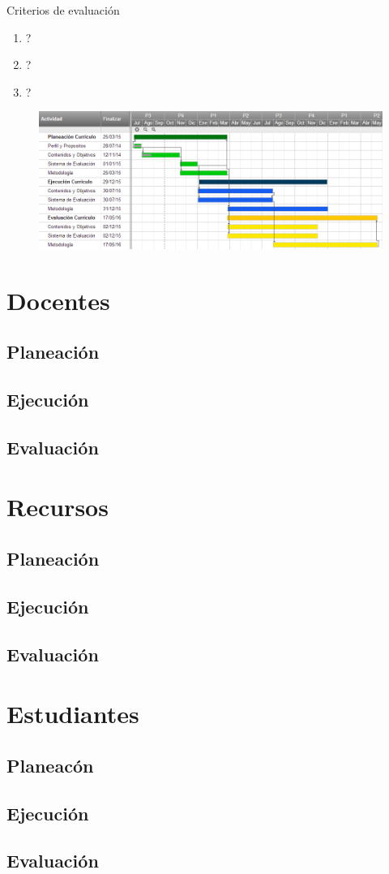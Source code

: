 \documentclass{beamer}
\begin{document}
\begin{frame}
\begin{block}{Criterios de evaluaci\'on}
\begin{enumerate}
\item ?
\item ?
\item ?
\end{enumerate}
\end{block}
\end{frame}
\begin{frame}
\begin{center}

\begin{figure}
\includegraphics[scale=0.4]{gannt.png}
\end{figure}
\end{center}
\end{frame}
\section{Docentes}
\subsection{Planeaci\'on}
\subsection{Ejecuci\'on}
\subsection{Evaluaci\'on}
\section{Recursos}
\subsection{Planeaci\'on}
\subsection{Ejecuci\'on}
\subsection{Evaluaci\'on}
\section{Estudiantes}
\subsection{Planeac\'on}
\subsection{Ejecuci\'on}
\subsection{Evaluaci\'on}
\end{document}
